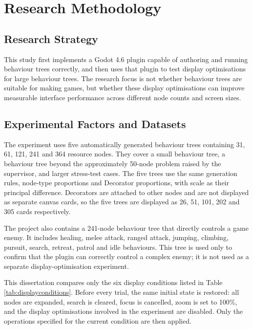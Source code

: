 \chapter{Research Methodology}
\label{ch:methodology}

\section{Research Strategy}

This study first implements a Godot 4.6 plugin capable of authoring and running behaviour trees correctly, and then uses that plugin to test display optimisations for large behaviour trees. The research focus is not whether behaviour trees are suitable for making games, but whether these display optimisations can improve measurable interface performance across different node counts and screen sizes.

\section{Experimental Factors and Datasets}

The experiment uses five automatically generated behaviour trees containing 31, 61, 121, 241 and 364 resource nodes. They cover a small behaviour tree, a behaviour tree beyond the approximately 50-node problem raised by the supervisor, and larger stress-test cases. The five trees use the same generation rules, node-type proportions and Decorator proportions, with scale as their principal difference. Decorators are attached to other nodes and are not displayed as separate canvas cards, so the five trees are displayed as 26, 51, 101, 202 and 305 cards respectively.

The project also contains a 241-node behaviour tree that directly controls a game enemy. It includes healing, melee attack, ranged attack, jumping, climbing, pursuit, search, retreat, patrol and idle behaviours. This tree is used only to confirm that the plugin can correctly control a complex enemy; it is not used as a separate display-optimisation experiment.

This dissertation compares only the six display conditions listed in Table \ref{tab:displayconditions}. Before every trial, the same initial state is restored: all nodes are expanded, search is cleared, focus is cancelled, zoom is set to 100\%, and the display optimisations involved in the experiment are disabled. Only the operations specified for the current condition are then applied.


